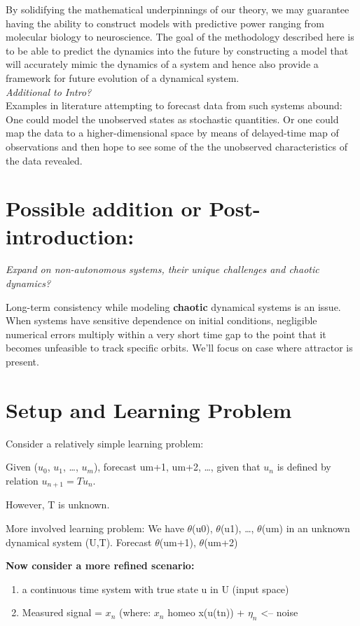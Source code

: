 \documentclass[12pt, oneside]{article}
\theoremstyle{definition}
\begin{document}
By solidifying the mathematical underpinnings of our theory, we may guarantee having the ability to
construct models with predictive power ranging from molecular biology to neuroscience.
The goal of the methodology described here is to be able to predict the dynamics into the future by
constructing a model that will accurately mimic the dynamics of a system and hence also provide a
framework for future evolution of a dynamical system.\\

\emph{Additional to Intro?}\\
Examples in literature attempting to forecast data from such systems abound: One could model the
unobserved states as stochastic quantities. Or one could map the data to a higher-dimensional space
by means of delayed-time map of observations and then hope to see some of the the unobserved
characteristics of the data revealed.

\newpage


\section{Possible addition or Post-introduction:}

\emph{Expand on non-autonomous systems, their unique challenges and chaotic dynamics?} 

Long-term consistency while modeling \textbf{chaotic} dynamical systems is an issue. When systems have 
sensitive dependence on initial conditions, negligible numerical errors multiply within a very short 
time gap to the point that it becomes unfeasible to track specific orbits.
We’ll focus on case where attractor is present.

\section{Setup and Learning Problem}

Consider a relatively simple learning problem:

Given ($u_{0}$, $u_{1}$, …, $u_{m}$), forecast um+1, um+2, …, given that $u_{n}$ is defined by relation  $u_{n+1} = Tu_{n}$. 


However, T is unknown.


More involved learning problem: We have $\theta$(u0), $\theta$(u1), …, $\theta$(um) in an unknown dynamical system (U,T). 
Forecast $\theta$(um+1), $\theta$(um+2)



\textbf{Now consider a more refined scenario:}
\begin{enumerate}
  \item  a continuous time system with true state u in U (input space)
  \item Measured signal = $x_{n}$ (where: $x_{n}$ homeo x(u(tn)) + $\eta_{n}$ <-- noise 
\end{enumerate}
\end{document}
